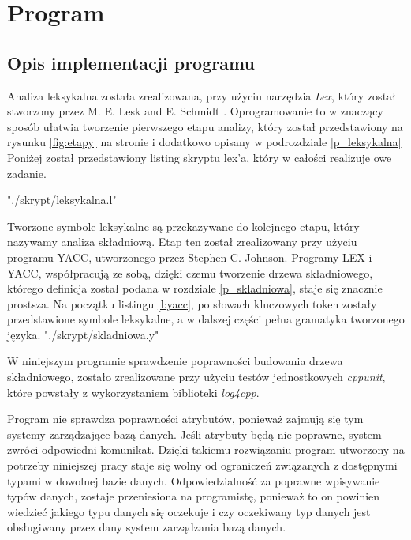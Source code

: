 \chapter{Program}

\section{Opis implementacji programu}



Analiza leksykalna została zrealizowana, 
  przy użyciu narzędzia \textit{Lex},
  który został stworzony przez M. E. Lesk and E. Schmidt \cite{link_lex}.
Oprogramowanie to w znaczący sposób ułatwia tworzenie pierwszego etapu analizy,
 który został przedstawiony na rysunku \ref{fig:etapy} na stronie \pageref{fig:etapy} 
 i dodatkowo opisany  w podrozdziale \ref{p_leksykalna}
Poniżej został przedstawiony listing skryptu lex'a,
 który w całości realizuje owe zadanie.

 {"./skrypt/leksykalna.l"}


Tworzone symbole leksykalne są przekazywane do kolejnego etapu,
 który nazywamy analiza składniową. 
Etap ten został zrealizowany przy użyciu programu YACC,
 utworzonego przez Stephen C. Johnson.
Programy LEX i YACC, współpracują ze sobą, dzięki czemu tworzenie drzewa składniowego,
 którego definicja został podana w rozdziale \ref{p_skladniowa}, 
 staje się znacznie prostsza.
Na początku listingu  \ref{l:yacc},
 po słowach kluczowych token zostały przedstawione symbole leksykalne,
a w dalszej części pełna gramatyka tworzonego języka.
 {"./skrypt/skladniowa.y"}  


W niniejszym programie sprawdzenie poprawności budowania drzewa składniowego,
 zostało zrealizowane przy użyciu testów jednostkowych \textit{cppunit}, 
 które powstały z wykorzystaniem biblioteki \textit{log4cpp}.

Program nie sprawdza poprawności atrybutów,
 ponieważ zajmują się tym systemy zarządzające bazą danych. 
Jeśli atrybuty będą nie poprawne,
 system zwróci odpowiedni komunikat. 
Dzięki takiemu rozwiązaniu program utworzony na potrzeby niniejszej pracy
 staje się wolny od ograniczeń związanych z dostępnymi typami w dowolnej bazie danych.
Odpowiedzialność za poprawne wpisywanie typów danych, zostaje przeniesiona na programistę,
 ponieważ to on powinien wiedzieć jakiego typu danych się oczekuje 
 i czy oczekiwany typ danych jest obsługiwany przez dany system zarządzania bazą danych.

